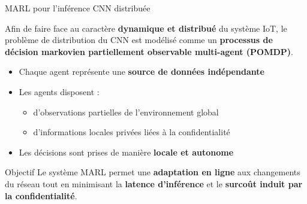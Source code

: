 \documentclass{beamer}
\begin{document}
\begin{frame}{MARL pour l’inférence CNN distribuée}

\small
Afin de faire face au caractère \textbf{dynamique et distribué} du système IoT,
le problème de distribution du CNN est modélisé comme un
\textbf{processus de décision markovien partiellement observable multi-agent (POMDP)}.

\medskip
\begin{itemize}
  \item Chaque agent représente une \textbf{source de données indépendante}
  \item Les agents disposent :
  \begin{itemize}
    \item d’observations partielles de l’environnement global
    \item d’informations locales privées liées à la confidentialité
  \end{itemize}
  \item Les décisions sont prises de manière \textbf{locale et autonome}
\end{itemize}

\medskip
\begin{block}{Objectif}
Le système MARL permet une \textbf{adaptation en ligne} aux changements du réseau
tout en minimisant la \textbf{latence d’inférence} et le \textbf{surcoût induit par la confidentialité}.
\end{block}

\end{frame}
\end{document}
